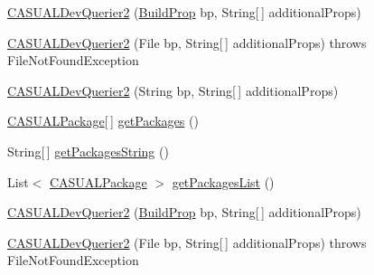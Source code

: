 \begin{DoxyCompactItemize}
\item 
\hyperlink{class_c_a_s_u_a_l_1_1network_1_1_c_a_s_u_a_l_dev_integration_1_1_c_a_s_u_a_l_dev_querier2_a5a1793572e78983ccf3371bfb3055121}{C\-A\-S\-U\-A\-L\-Dev\-Querier2} (\hyperlink{class_c_a_s_u_a_l_1_1communicationstools_1_1adb_1_1_build_prop}{Build\-Prop} bp, String\mbox{[}$\,$\mbox{]} additional\-Props)
\item 
\hyperlink{class_c_a_s_u_a_l_1_1network_1_1_c_a_s_u_a_l_dev_integration_1_1_c_a_s_u_a_l_dev_querier2_a6a0796c4808046d2abc38793c99e2134}{C\-A\-S\-U\-A\-L\-Dev\-Querier2} (File bp, String\mbox{[}$\,$\mbox{]} additional\-Props)  throws File\-Not\-Found\-Exception 
\item 
\hyperlink{class_c_a_s_u_a_l_1_1network_1_1_c_a_s_u_a_l_dev_integration_1_1_c_a_s_u_a_l_dev_querier2_ad7a671dc1295f21cb2d725157c5dcd29}{C\-A\-S\-U\-A\-L\-Dev\-Querier2} (String bp, String\mbox{[}$\,$\mbox{]} additional\-Props)
\item 
\hyperlink{class_c_a_s_u_a_l_1_1network_1_1_c_a_s_u_a_l_dev_integration_1_1_c_a_s_u_a_l_package}{C\-A\-S\-U\-A\-L\-Package}\mbox{[}$\,$\mbox{]} \hyperlink{class_c_a_s_u_a_l_1_1network_1_1_c_a_s_u_a_l_dev_integration_1_1_c_a_s_u_a_l_dev_querier2_a3de0c87c69050c0eb316a82b6f871a1b}{get\-Packages} ()
\item 
String\mbox{[}$\,$\mbox{]} \hyperlink{class_c_a_s_u_a_l_1_1network_1_1_c_a_s_u_a_l_dev_integration_1_1_c_a_s_u_a_l_dev_querier2_a30068534c51ade3564df1200c2964d1f}{get\-Packages\-String} ()
\item 
List$<$ \hyperlink{class_c_a_s_u_a_l_1_1network_1_1_c_a_s_u_a_l_dev_integration_1_1_c_a_s_u_a_l_package}{C\-A\-S\-U\-A\-L\-Package} $>$ \hyperlink{class_c_a_s_u_a_l_1_1network_1_1_c_a_s_u_a_l_dev_integration_1_1_c_a_s_u_a_l_dev_querier2_a1206d3c0aba096946cabaeea185c999d}{get\-Packages\-List} ()
\item 
\hyperlink{class_c_a_s_u_a_l_1_1network_1_1_c_a_s_u_a_l_dev_integration_1_1_c_a_s_u_a_l_dev_querier2_a5a1793572e78983ccf3371bfb3055121}{C\-A\-S\-U\-A\-L\-Dev\-Querier2} (\hyperlink{class_c_a_s_u_a_l_1_1communicationstools_1_1adb_1_1_build_prop}{Build\-Prop} bp, String\mbox{[}$\,$\mbox{]} additional\-Props)
\item 
\hyperlink{class_c_a_s_u_a_l_1_1network_1_1_c_a_s_u_a_l_dev_integration_1_1_c_a_s_u_a_l_dev_querier2_a6a0796c4808046d2abc38793c99e2134}{C\-A\-S\-U\-A\-L\-Dev\-Querier2} (File bp, String\mbox{[}$\,$\mbox{]} additional\-Props)  throws File\-Not\-Found\-Exception 
\item 

\end{DoxyCompactItemize}
